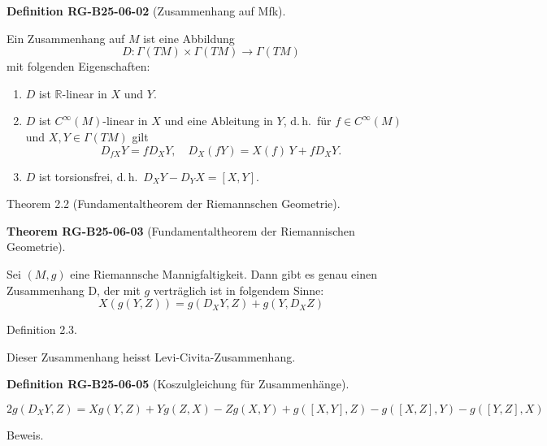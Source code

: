 \documentclass[10pt, letterpaper]{article}
\newcommand{\CustomHeading}[3]{%
  \par\medskip\noindent%
  \textbf{#1 #2} \textnormal{(#3)}.\enskip%
}
\newenvironment{DEF}[2]{\begin{unitbox}\CustomHeading{Definition}{#1}{#2}}{\end{unitbox}}
\newenvironment{THEO}[2]{\begin{unitbox}\CustomHeading{Theorem}{#1}{#2}}{\end{unitbox}}
\begin{document}
\begin{DEF}{RG-B25-06-02}{Zusammenhang auf Mfk}
Ein Zusammenhang auf $M$ ist eine Abbildung
$$
D: \Gamma(T M) \times \Gamma(T M) \rightarrow \Gamma(T M)
$$
mit folgenden Eigenschaften:

\begin{enumerate}
  \item $D$ ist $\mathbb{R}$-linear in $X$ und $Y$.
  \item $D$ ist $C^{\infty}(M)$-linear in $X$ und eine Ableitung in $Y$, d.\,h.\ für $f \in C^{\infty}(M)$ und $X, Y \in \Gamma(TM)$ gilt
  \[
  D_{f X} Y = f D_X Y, \quad D_X(f Y) = X(f)\, Y + f D_X Y.
  \]
  \item $D$ ist torsionsfrei, d.\,h.\ $D_X Y - D_Y X = [X, Y]$.
\end{enumerate}
\end{DEF}





Theorem 2.2 (Fundamentaltheorem der Riemannschen Geometrie). 


\begin{THEO}{RG-B25-06-03}{Fundamentaltheorem der Riemannischen Geometrie}
Sei $(M, g)$ eine Riemannsche Mannigfaltigkeit. Dann gibt es genau einen Zusammenhang D, der mit $g$ verträglich ist in folgendem Sinne:
$$
X(g(Y, Z))=g\left(D_{X} Y, Z\right)+g\left(Y, D_{X} Z\right)
$$
\end{THEO}



Definition 2.3. 

Dieser Zusammenhang heisst Levi-Civita-Zusammenhang.


\begin{DEF}{RG-B25-06-05}{Koszulgleichung für Zusammenhänge}
$$2 g\left(D_{X} Y, Z\right)=X g(Y, Z)+Y g(Z, X)-Z g(X, Y)+g([X, Y], Z)-g([X, Z], Y)-g([Y, Z], X)$$
\end{DEF}


Beweis. 
\end{document}

